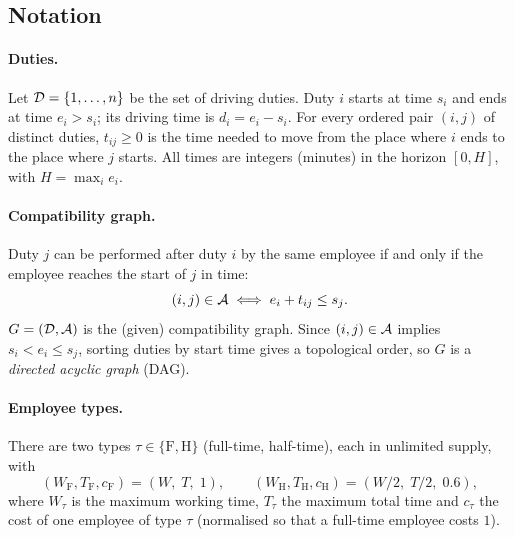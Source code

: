 
\subsection{Notation}
\label{sec:notation}

\paragraph{Duties.}
Let $\mathcal{D}=\{1,\dots,n\}$ be the set of driving duties. Duty $i$ starts at time
$s_i$ and ends at time $e_i>s_i$; its driving time is $d_i=e_i-s_i$. For every
ordered pair $(i,j)$ of distinct duties, $t_{ij}\ge 0$ is the time needed to
move from the place where $i$ ends to the place where $j$ starts. All times are
integers (minutes) in the horizon $[0,H]$, with $H=\max_i e_i$.

\paragraph{Compatibility graph.}
Duty $j$ can be performed after duty $i$ by the same employee if and only if
the employee reaches the start of $j$ in time:
\begin{equation}\label{eq:arc}
  (i,j)\in\mathcal{A} \iff e_i+t_{ij}\le s_j .
\end{equation}
$G=(\mathcal{D},\mathcal{A})$ is the (given) compatibility graph. Since $(i,j)\in\mathcal{A}$ implies
$s_i<e_i\le s_j$, sorting duties by start time gives a topological order, so
$G$ is a \emph{directed acyclic graph} (DAG).

\paragraph{Employee types.}
There are two types $\tau\in\{\mathrm{F},\mathrm{H}\}$ (full-time,
half-time), each in unlimited supply, with
\[
  (W_{\mathrm F},T_{\mathrm F},c_{\mathrm F})=(W,\;T,\;1),\qquad
  (W_{\mathrm H},T_{\mathrm H},c_{\mathrm H})=(W/2,\;T/2,\;0.6),
\]
where $W_\tau$ is the maximum working time, $T_\tau$ the maximum total time
and $c_\tau$ the cost of one employee of type $\tau$ (normalised so that a
full-time employee costs $1$).

